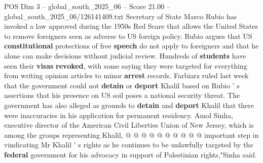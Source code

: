 \begin{textsample}{POS Dim 3 – global\_south\_2025\_06 – Score 21.00 – global\_south\_2025\_06/126141409.txt}
Secretary of State Marco Rubio has invoked a law approved during the 1950s Red Scare that allows the United States to remove foreigners seen as adverse to US foreign policy.
Rubio argues that US \textbf{constitutional} protections of free \textbf{speech} do not apply to foreigners and that he alone can make decisions without judicial review.
Hundreds of \textbf{students} have seen their \textbf{visas} \textbf{revoked}, with some saying they were targeted for everything from writing opinion articles to minor \textbf{arrest} records.
Farbiarz ruled last week that the government could not \textbf{detain} or \textbf{deport} Khalil based on Rubio ' s assertions that his presence on US soil poses a national security threat.
The government has also alleged as grounds to \textbf{detain} and \textbf{deport} Khalil that there were inaccuracies in his application for permanent residency.
Amol Sinha, executive director of the American Civil Liberties Union of New Jersey, which is among the groups representing Khalil, @ @ @ @ @ @ @ @ @ @ important step in vindicating Mr Khalil ' s rights as he continues to be unlawfully targeted by the \textbf{federal} government for his advocacy in support of Palestinian rights,"Sinha said.

\end{textsample}
